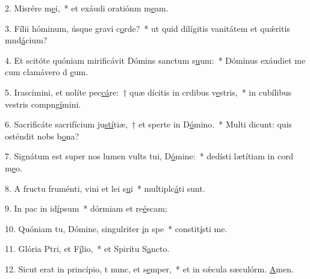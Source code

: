 2. Misrére m\uline{e}i,~* et exáudi oratiónm m\uline{e}am.\par 
3. Fílii hóminum, úsque gravi c\uline{o}rde?~* ut quid dilígitis vanitátem et quǽritis mnd\uline{á}cium?\par 
4. Et scitóte quóniam mirificávit Dómins sanctum s\uline{u}um:~* Dóminus exáudiet me cum clamávero d \uline{e}um.\par 
5. Irascímini, et nolíte pec\uline{cá}re:~† quæ dícitis in crdibus v\uline{e}stris,~* in cubílibus vestris compng\uline{í}mini.\par 
6. Sacrificáte sacrifícium ju\uline{stí}tiæ,~† et sperte in D\uline{ó}mino.~* Multi dicunt: quis osténdit nobs b\uline{o}na?\par 
7. Signátum est super nos lumen vults tui, D\uline{ó}mine:~* dedísti lætítiam in cord m\uline{e}o.\par 
8. A fructu fruménti, vini et lei s\uline{u}i~* multiplc\uline{á}ti sunt.\par 
9. In pac in id\uline{í}psum~* dórmiam et re\uline{é}scam;\par 
10. Quóniam tu, Dómine, singulriter \uline{i}n spe~* constit\uline{í}sti me.\par 
11. Glória Ptri, et F\uline{í}lio,~* et Spirítu S\uline{a}ncto.\par 
12. Sicut erat in princípio, t nunc, et s\uline{e}mper,~* et in sǽcula sæculórm. \uline{A}men.\par 
